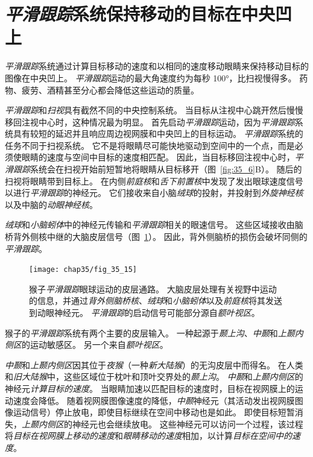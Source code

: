 \section{\textit{平滑跟踪}系统保持移动的目标在中央凹上}

\textit{平滑跟踪}系统通过计算目标移动的速度和以相同的速度移动眼睛来保持移动目标的图像在中央凹上。
\textit{平滑跟踪}运动的最大角速度约为每秒 100°，比扫视慢得多。
药物、疲劳、酒精甚至分心都会降低这些运动的质量。


\textit{平滑跟踪}和\textit{扫视}具有截然不同的中央控制系统。
当目标从注视中心跳开然后慢慢移回注视中心时，这种情况最为明显。
首先启动\textit{平滑跟踪}运动，因为\textit{平滑跟踪}系统具有较短的延迟并且响应周边视网膜和中央凹上的目标运动。
\textit{平滑跟踪}系统的任务不同于扫视系统。
它不是将眼睛尽可能快地驱动到空间中的一个点，而是必须使眼睛的速度与空间中目标的速度相匹配。
因此，当目标移回注视中心时，\textit{平滑跟踪}系统会在扫视开始前短暂地将眼睛从目标移开（图~\ref{fig:35_6}B）。
随后的扫视将眼睛带到目标上。
在内侧\textit{前庭核}和\textit{舌下前置核}中发现了发出眼球速度信号以进行\textit{平滑跟踪}的神经元。
它们接收来自小脑\textit{绒球}的投射，并投射到\textit{外旋神经核}以及中脑的\textit{动眼神经核}。


\textit{绒球}和\textit{小脑蚓体}中的神经元传输和\textit{平滑跟踪}相关的眼速信号。
这些区域接收由脑桥背外侧核中继的大脑皮层信号（图~\ref{fig:35_15}）。
因此，背外侧脑桥的损伤会破坏同侧的\textit{平滑跟踪}。


\begin{figure}[htbp]
	\centering
	\texttt{[image: chap35/fig\_35\_15]}
	\caption{猴子\textit{平滑跟踪}眼球运动的皮层通路。
		大脑皮层处理有关视野中运动的信息，并通过\textit{背外侧脑桥核}、\textit{绒球}和\textit{小脑蚓体}以及\textit{前庭核}将其发送到动眼神经元。
		\textit{平滑跟踪}的启动信号可能部分源自\textit{额叶视区}。}
	\label{fig:35_15}
\end{figure}


猴子的\textit{平滑跟踪}系统有两个主要的皮层输入。
一种起源于\textit{颞上沟}、\textit{中颞}和\textit{上颞内侧区}的运动敏感区。
另一个来自\textit{额叶视区}。


\textit{中颞}和\textit{上颞内侧区}因其位于\textit{夜猴}（一种\textit{新大陆猴}）的无沟皮层中而得名。
在人类和\textit{旧大陆猴}中，这些区域位于枕叶和顶叶交界处的\textit{颞上沟}。
\textit{中颞}和\textit{上颞内侧区}的神经元\textit{计算目标的速度}。
当眼睛加速以匹配目标的速度时，目标在视网膜上的运动速度会降低。
随着视网膜图像速度的降低，\textit{中颞}神经元（其活动发出视网膜图像运动信号）停止放电，即使目标继续在空间中移动也是如此。
即使目标短暂消失，\textit{上颞内侧区}的神经元也会继续放电。
这些神经元可以访问一个过程，该过程将\textit{目标在视网膜上移动的速度}和\textit{眼睛移动的速度}相加，以计算\textit{目标在空间中的速度}。


